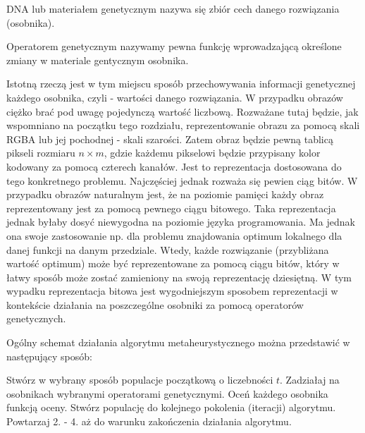 \begin{definition}
DNA lub materiałem genetycznym nazywa się zbiór cech danego rozwiązania (osobnika).
\end{definition}

\begin{definition}
Operatorem genetycznym nazywamy pewna funkcję wprowadzającą określone zmiany w materiale gentycznym osobnika.
\end{definition}

Istotną rzeczą jest w tym miejscu sposób przechowywania informacji genetycznej każdego osobnika, czyli - wartości danego rozwiązania. W przypadku obrazów ciężko brać pod uwagę pojedynczą wartość liczbową. Rozważane tutaj będzie, jak wspomniano na początku tego rozdziału, reprezentowanie obrazu za pomocą skali RGBA lub jej pochodnej - skali szarości. Zatem obraz będzie pewną tablicą pikseli rozmiaru $n \times m$, gdzie każdemu pikselowi będzie przypisany kolor kodowany za pomocą czterech kanałów. Jest to reprezentacja dostosowana do tego konkretnego problemu. Najczęściej jednak rozważa się pewien ciąg bitów. W przypadku obrazów naturalnym jest, że na poziomie pamięci każdy obraz reprezentowany jest za pomocą pewnego ciągu bitowego. Taka reprezentacja jednak byłaby dosyć niewygodna na poziomie języka programowania. Ma jednak ona swoje zastosowanie np. dla problemu znajdowania optimum lokalnego dla danej funkcji na danym przedziale. Wtedy, każde rozwiązanie (przybliżana wartość optimum) może być reprezentowane za pomocą ciągu bitów, który w łatwy sposób może zostać zamieniony na swoją reprezentację dziesiętną. W tym wypadku reprezentacja bitowa jest wygodniejszym sposobem reprezentacji w kontekście działania na poszczególne osobniki za pomocą operatorów genetycznych.

Ogólny schemat działania algorytmu metaheurystycznego można przedstawić w następujący sposób:

\begin{algorithm}
    \begin{algorithmic}[1]
        \State Stwórz w wybrany sposób populacje początkową o liczebności $t$.
        \State Zadziałaj na osobnikach wybranymi operatorami genetycznymi.
        \State Oceń każdego osobnika funkcją oceny.
        \State Stwórz populację do kolejnego pokolenia (iteracji) algorytmu.
        \State Powtarzaj 2. - 4. aż do warunku zakończenia działania algorytmu.
    \end{algorithmic}
\end{algorithm}

